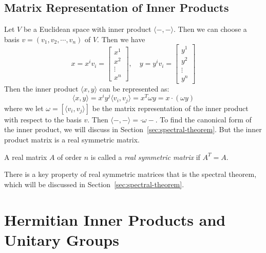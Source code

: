 \subsection{Matrix Representation of Inner Products}

Let $V$ be a Euclidean space with inner product $\langle -, - \rangle$. Then we can choose a basis $v = (v_1, v_2, \cdots, v_n)$ of $V$. Then we have
\[
	x = x^i v_i = \begin{bmatrix}
		x^1    \\
		x^2    \\
		\vdots \\
		x^n
	\end{bmatrix}, \quad y = y^i v_i = \begin{bmatrix}
		y^1    \\
		y^2    \\
		\vdots \\
		y^n
	\end{bmatrix}
\]
Then the inner product $\langle x, y \rangle$ can be represented as:
\[
	\langle x, y \rangle = x^i y^j \langle v_i, v_j \rangle = x^T \omega y = x \cdot (\omega y)
\]
where we let $\omega = [\langle v_i, v_j \rangle]$ be the matrix representation of the inner product with respect to the basis $v$. Then $\langle -, - \rangle = \cdot \omega -$. To find the canonical form of the inner product, we will discuss in Section~\ref{sec:spectral-theorem}. But the inner product matrix is a real symmetric matrix.

\begin{definition}\label{def:real_symmetric_matrix}
	A real matrix $A$ of order $n$ is called a \emph{real symmetric matrix} if $A^T = A$.
\end{definition}

There is a key property of real symmetric matrices that is the spectral theorem, which will be discussed in Section~\ref{sec:spectral-theorem}.

\section{Hermitian Inner Products and Unitary Groups}

